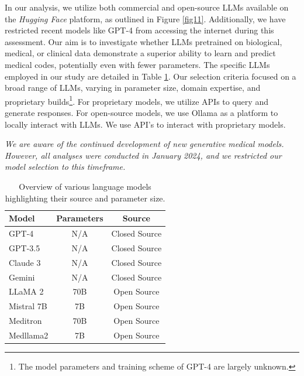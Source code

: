 \documentclass[11pt]{article}
\theoremstyle{plain}
\theoremstyle{definition}
\theoremstyle{remark}
\begin{document}


In our analysis, we utilize both commercial and open-source LLMs available on the \textit{Hugging Face} platform, as outlined in Figure \ref{fig11}. Additionally, we have restricted recent models like GPT-4 from accessing the internet during this assessment. Our aim is to investigate whether LLMs pretrained on biological, medical, or clinical data demonstrate a superior ability to learn and predict medical codes, potentially even with fewer parameters. The specific LLMs employed in our study are detailed in Table \ref{tab11}. Our selection criteria focused on a broad range of LLMs, varying in parameter size, domain expertise, and proprietary builds\footnote{The model parameters and training scheme of GPT-4 are largely unknown.}. For proprietary models, we utilize APIs to query and generate responses. For open-source models, we use Ollama as a platform to locally interact with LLMs. We use API's to interact with proprietary models.

\textit{We are aware of the continued development of new generative medical models. However, all analyses were conducted in January 2024, and we restricted our model selection to this timeframe.}

\begin{table}[h]
  \centering 
  \caption{Overview of various language models highlighting their source and parameter size.}
  \begin{adjustbox}{width=\columnwidth, center}
    \begin{tabular}{lcc}
    \toprule
      \textbf{Model} & \textbf{Parameters} & \textbf{Source} \\
      \midrule
      GPT-4 & N/A & Closed Source \\
      GPT-3.5 & N/A & Closed  Source \\
      Claude 3 & N/A & Closed Source \\
      Gemini & N/A & Closed Source \\
      LLaMA 2 & 70B & Open Source \\
      Mistral 7B & 7B & Open Source \\
      Meditron & 70B & Open Source \\
      Medllama2 & 7B & Open Source \\
      \bottomrule
    \end{tabular}
  \end{adjustbox}
  \label{tab11} 
\end{table}
\end{document}

